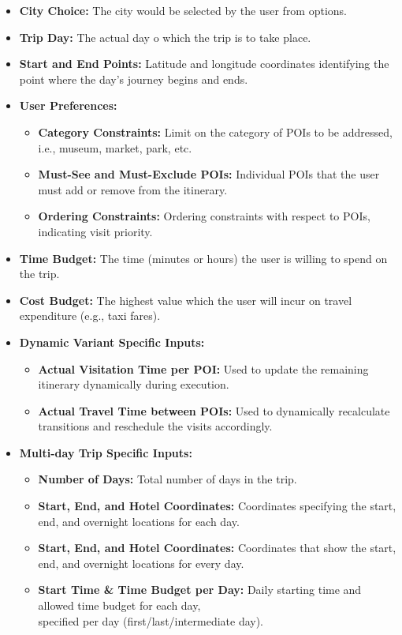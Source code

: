 \begin{itemize}
    \item \textbf{City Choice:} The city would be selected by the user from options.
    
    \item \textbf{Trip Day:} The actual day o which the trip is to take place.

    \item \textbf{Start and End Points:} Latitude and longitude coordinates identifying the point where the day's journey begins and ends.
    
    \item \textbf{User Preferences:}
    \begin{itemize}
        \item \textbf{Category Constraints:} Limit on the category of POIs to be addressed, i.e., museum, market, park, etc.
        \item \textbf{Must-See and Must-Exclude POIs:} Individual POIs that the user must add or remove from the itinerary.
        \item \textbf{Ordering Constraints:} Ordering constraints with respect to POIs, indicating visit priority.
    \end{itemize}
    
    \item \textbf{Time Budget:} The time (minutes or hours) the user is willing to spend on the trip.
    \item \textbf{Cost Budget:} The highest value which the user will incur on travel expenditure (e.g., taxi fares).
    
    \item \textbf{Dynamic Variant Specific Inputs:}
    \begin{itemize}
        \item \textbf{Actual Visitation Time per POI:} Used to update the remaining itinerary dynamically during execution.
        \item \textbf{Actual Travel Time between POIs:} Used to dynamically recalculate transitions and reschedule the visits accordingly.
    \end{itemize}
    
    \item \textbf{Multi-day Trip Specific Inputs:}
    \begin{itemize}
        \item \textbf{Number of Days:} Total number of days in the trip.
        \item \textbf{Start, End, and Hotel Coordinates:} Coordinates specifying the start, end, and overnight locations for each day.
        \item \textbf{Start, End, and Hotel Coordinates:} Coordinates that show the start, end, and overnight locations for every day.
        \item \textbf{Start Time \& Time Budget per Day:} Daily starting time and allowed time budget for each day, \\specified per day (first/last/intermediate day).
    \end{itemize}
\end{itemize}
